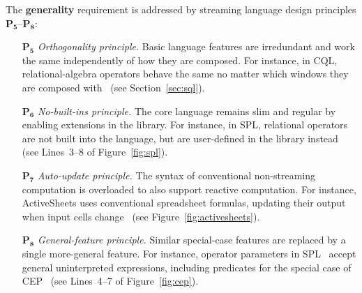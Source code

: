 The \textbf{generality} requirement is addressed by streaming language
design principles $\mathbf{P_5}$--$\mathbf{P_8}$:
\begin{itemize}
  \item[$\mathbf{P_5}$] \emph{Orthogonality principle.} Basic language
    features are irredundant and work the same independently of how
    they are composed. For instance, in CQL, relational-algebra
    operators behave the same no matter which windows they are
    composed with~\cite{arasu_babu_widom_2006} (see
    Section~\ref{sec:sql}).
  \item[$\mathbf{P_6}$] \emph{No-built-ins principle.} The core language
    remains slim and regular by enabling extensions in the library. For
    instance, in SPL, relational operators are not built into the
    language, but are user-defined in the library
    instead~\cite{hirzel_schneider_gedik_2017} (see \mbox{Lines 3--8}
    of Figure~\ref{fig:spl}).
  \item[$\mathbf{P_7}$] \emph{Auto-update principle.} The syntax of
    conventional non-streaming computation is overloaded to also
    support reactive computation. For instance, ActiveSheets uses
    conventional spreadsheet formulas, updating their output when
    input cells change~\cite{vaziri_et_al_2014} (see
    Figure~\ref{fig:activesheets}).
  \item[$\mathbf{P_8}$] \emph{General-feature principle.} Similar
    special-case features are replaced by a single more-general
    feature. For instance, operator parameters in
    SPL~\cite{hirzel_schneider_gedik_2017} accept general
    uninterpreted expressions, including predicates for the special
    case of CEP~\cite{hirzel_2012} (see \mbox{Lines 4--7} of
    Figure~\ref{fig:cep}).
\end{itemize}

